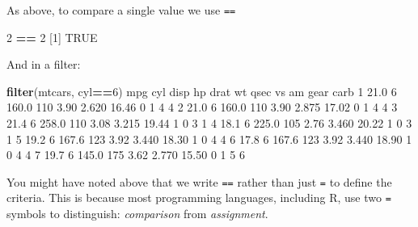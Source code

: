 \documentclass[]{article}
\newenvironment{Shaded}{\begin{snugshade}}{\end{snugshade}}
\newcommand{\DecValTok}[1]{\textcolor[rgb]{0.00,0.00,0.81}{#1}}
\newcommand{\FloatTok}[1]{\textcolor[rgb]{0.00,0.00,0.81}{#1}}
\newcommand{\KeywordTok}[1]{\textcolor[rgb]{0.13,0.29,0.53}{\textbf{#1}}}
\newcommand{\NormalTok}[1]{#1}
\newcommand{\OperatorTok}[1]{\textcolor[rgb]{0.81,0.36,0.00}{\textbf{#1}}}
\newcommand{\OtherTok}[1]{\textcolor[rgb]{0.56,0.35,0.01}{#1}}
\newcommand{\StringTok}[1]{\textcolor[rgb]{0.31,0.60,0.02}{#1}}
\begin{document}
As above, to compare a single value we use \texttt{==}

\begin{Shaded}
\begin{Highlighting}[]
\DecValTok{2} \OperatorTok{==}\StringTok{ }\DecValTok{2}
\NormalTok{[}\DecValTok{1}\NormalTok{] }\OtherTok{TRUE}
\end{Highlighting}
\end{Shaded}

And in a filter:

\begin{Shaded}
\begin{Highlighting}[]
\KeywordTok{filter}\NormalTok{(mtcars, cyl}\OperatorTok{==}\DecValTok{6}\NormalTok{)}
\NormalTok{   mpg cyl  disp  hp drat    wt  qsec vs am gear carb}
\DecValTok{1} \FloatTok{21.0}   \DecValTok{6} \FloatTok{160.0} \DecValTok{110} \FloatTok{3.90} \FloatTok{2.620} \FloatTok{16.46}  \DecValTok{0}  \DecValTok{1}    \DecValTok{4}    \DecValTok{4}
\DecValTok{2} \FloatTok{21.0}   \DecValTok{6} \FloatTok{160.0} \DecValTok{110} \FloatTok{3.90} \FloatTok{2.875} \FloatTok{17.02}  \DecValTok{0}  \DecValTok{1}    \DecValTok{4}    \DecValTok{4}
\DecValTok{3} \FloatTok{21.4}   \DecValTok{6} \FloatTok{258.0} \DecValTok{110} \FloatTok{3.08} \FloatTok{3.215} \FloatTok{19.44}  \DecValTok{1}  \DecValTok{0}    \DecValTok{3}    \DecValTok{1}
\DecValTok{4} \FloatTok{18.1}   \DecValTok{6} \FloatTok{225.0} \DecValTok{105} \FloatTok{2.76} \FloatTok{3.460} \FloatTok{20.22}  \DecValTok{1}  \DecValTok{0}    \DecValTok{3}    \DecValTok{1}
\DecValTok{5} \FloatTok{19.2}   \DecValTok{6} \FloatTok{167.6} \DecValTok{123} \FloatTok{3.92} \FloatTok{3.440} \FloatTok{18.30}  \DecValTok{1}  \DecValTok{0}    \DecValTok{4}    \DecValTok{4}
\DecValTok{6} \FloatTok{17.8}   \DecValTok{6} \FloatTok{167.6} \DecValTok{123} \FloatTok{3.92} \FloatTok{3.440} \FloatTok{18.90}  \DecValTok{1}  \DecValTok{0}    \DecValTok{4}    \DecValTok{4}
\DecValTok{7} \FloatTok{19.7}   \DecValTok{6} \FloatTok{145.0} \DecValTok{175} \FloatTok{3.62} \FloatTok{2.770} \FloatTok{15.50}  \DecValTok{0}  \DecValTok{1}    \DecValTok{5}    \DecValTok{6}
\end{Highlighting}
\end{Shaded}

You might have noted above that we write \texttt{==} rather than just \texttt{=} to define the
criteria. This is because most programming languages, including R, use two \texttt{=}
symbols to distinguish: \emph{comparison} from \emph{assignment}.
\end{document}
